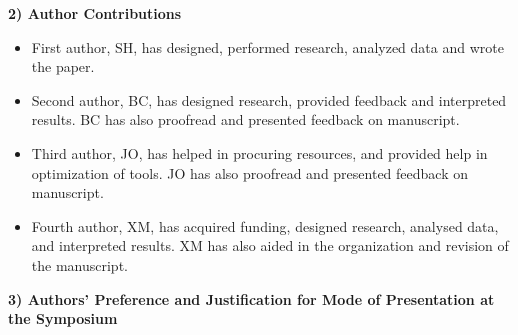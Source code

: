 \documentclass[twocolumn,10pt,dvipsnames]{article} %
\begin{document}
\begin{@twocolumnfalse}
\vspace{20pt} 

{\bf 2) Author Contributions}
\vspace{10pt}

\begin{itemize}

  \item First author, SH, has designed, performed research, analyzed data and wrote the paper.

  \item Second author, BC, has designed research, provided feedback and interpreted results. BC has also proofread and presented feedback on manuscript.

  \item Third author, JO, has helped in procuring resources, and provided help in optimization of tools. JO has also proofread and presented feedback on manuscript.

  \item Fourth author, XM, has acquired funding, designed research, analysed data, and interpreted results. XM has also aided in the organization and revision of the manuscript.

\end{itemize}

\vspace{10pt}

{\bf 3) Authors' Preference and Justification for Mode of Presentation at the Symposium}

\vspace{10pt}


\end{@twocolumnfalse}
\end{document}

